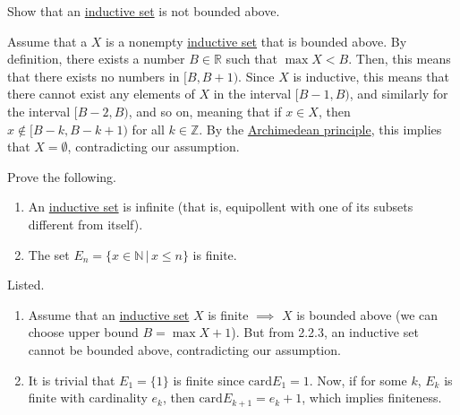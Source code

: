   \begin{exercise}[Zorich 2.2.3]
    Show that an \hyperref[st-def:inductive-set]{inductive set} is not bounded above. 
  \end{exercise}
  \begin{solution}
    Assume that a $X$ is a nonempty \hyperref[st-def:inductive-set]{inductive set} that is bounded above. By definition, there exists a number $B \in \mathbb{R}$ such that $\max{X} < B$. Then, this means that there exists no numbers in $[B, B + 1)$. Since $X$ is inductive, this means that there cannot exist any elements of $X$ in the interval $[B-1, B)$, and similarly for the interval $[B-2, B)$, and so on, meaning that if $x \in X$, then $x \not\in [B-k, B-k + 1)$ for all $k\in \mathbb{Z}$. By the \hyperref[def:archimedean-principle]{Archimedean principle}, this implies that $X = \emptyset$, contradicting our assumption. 
  \end{solution}

  \begin{exercise}[Zorich 2.2.4]
    Prove the following. 
    \begin{enumerate}
      \item An \hyperref[st-def:inductive-set]{inductive set} is infinite (that is, equipollent with one of its subsets different from itself). 
      \item The set $E_n = \{x \in \mathbb{N}\,|\, x \leq n\}$ is finite. 
    \end{enumerate}
  \end{exercise}
  \begin{solution}
    Listed. 
    \begin{enumerate}
      \item Assume that an \hyperref[st-def:inductive-set]{inductive set} $X$ is finite $\implies$ $X$ is bounded above (we can choose upper bound $B = \max{X} + 1$). But from 2.2.3, an inductive set cannot be bounded above, contradicting our assumption. 
      \item It is trivial that $E_1 = \{1\}$ is finite since $\text{card}{E_1} = 1$. Now, if for some $k$, $E_k$ is finite with cardinality $e_k$, then $\text{card}{E_{k+1}} = e_k + 1$, which implies finiteness.  
    \end{enumerate}
  \end{solution}


